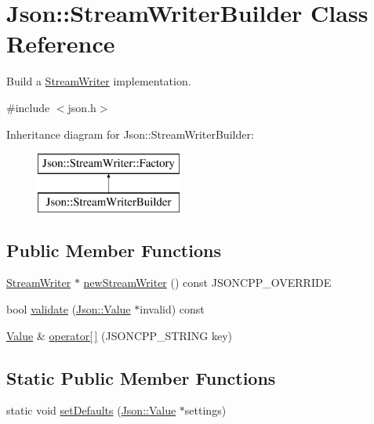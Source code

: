 \hypertarget{classJson_1_1StreamWriterBuilder}{}\section{Json\+:\+:Stream\+Writer\+Builder Class Reference}
\label{classJson_1_1StreamWriterBuilder}


Build a \hyperlink{classJson_1_1StreamWriter}{Stream\+Writer} implementation.  




{\ttfamily \#include $<$json.\+h$>$}

Inheritance diagram for Json\+:\+:Stream\+Writer\+Builder\+:\begin{figure}[H]
\begin{center}
\leavevmode
\includegraphics[height=2.000000cm]{classJson_1_1StreamWriterBuilder}
\end{center}
\end{figure}
\subsection*{Public Member Functions}
\begin{DoxyCompactItemize}
\item 
\hyperlink{classJson_1_1StreamWriter}{Stream\+Writer} $\ast$ \hyperlink{classJson_1_1StreamWriterBuilder_ab9ee278609f88ae04a7c1a84e1f559e6}{new\+Stream\+Writer} () const J\+S\+O\+N\+C\+P\+P\+\_\+\+O\+V\+E\+R\+R\+I\+DE
\item 
bool \hyperlink{classJson_1_1StreamWriterBuilder_a12353b97766841db7d049da84658da09}{validate} (\hyperlink{classJson_1_1Value}{Json\+::\+Value} $\ast$invalid) const
\item 
\hyperlink{classJson_1_1Value}{Value} \& \hyperlink{classJson_1_1StreamWriterBuilder_af68f6b59cb20b074052ed12bb3d336a3}{operator\mbox{[}$\,$\mbox{]}} (J\+S\+O\+N\+C\+P\+P\+\_\+\+S\+T\+R\+I\+NG key)
\end{DoxyCompactItemize}
\subsection*{Static Public Member Functions}
\begin{DoxyCompactItemize}
\item 
static void \hyperlink{classJson_1_1StreamWriterBuilder_a53bf106b141e28637b01ad0ecd2acbf6}{set\+Defaults} (\hyperlink{classJson_1_1Value}{Json\+::\+Value} $\ast$settings)
\end{DoxyCompactItemize}

